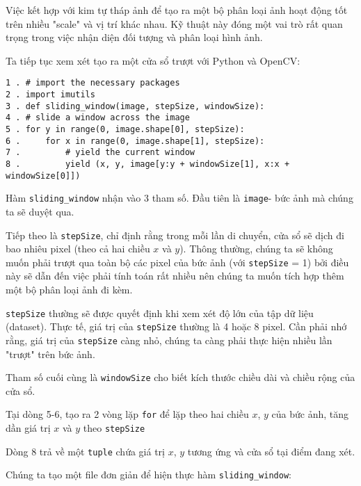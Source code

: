 \documentclass[12pt,a4paper]{article}
\begin{document}
Việc kết hợp với kim tự tháp ảnh để tạo ra một bộ phân loại ảnh hoạt động tốt trên nhiều "scale" và vị trí khác nhau. Kỹ thuật này đóng một vai trò rất quan trọng trong việc nhận diện đối tượng và phân loại hình ảnh.

Ta tiếp tục xem xét tạo ra một cửa sổ trượt với Python và OpenCV:
\begin{lstlisting}
1 . # import the necessary packages
2 . import imutils
3 . def sliding_window(image, stepSize, windowSize):
4 .	# slide a window across the image
5 .	for y in range(0, image.shape[0], stepSize):
6 .		for x in range(0, image.shape[1], stepSize):
7 .			# yield the current window
8 .			yield (x, y, image[y:y + windowSize[1], x:x + windowSize[0]])
\end{lstlisting}

Hàm \verb|sliding_window| nhận vào 3 tham số. Đầu tiên là \verb|image|- bức ảnh mà chúng ta sẽ duyệt qua.

Tiếp theo là \verb|stepSize|, chỉ định rằng trong mỗi lần di chuyển, cửa sổ sẽ dịch đi bao nhiêu pixel (theo cả hai chiều $x$ và $y$). Thông thường, chúng ta sẽ không muốn phải trượt qua toàn bộ các pixel của bức ảnh (với \verb|stepSize| = 1) bởi điều này sẽ dẫn đến việc phải tính toán rất nhiều nên chúng ta muốn tích hợp thêm một bộ phân loại ảnh đi kèm.

\verb|stepSize| thường sẽ được quyết định khi xem xét độ lớn của tập dữ liệu (dataset). Thực tế, giá trị của \verb|stepSize| thường là 4 hoặc 8 pixel. Cần phải nhớ rằng, giá trị của \verb|stepSize| càng nhỏ, chúng ta càng phải thực hiện nhiều lần "trượt" trên bức ảnh.

Tham số cuối cùng là \verb|windowSize| cho biết kích thước chiều dài và chiều rộng của cửa sổ.

Tại dòng 5-6, tạo ra 2 vòng lặp \verb|for| để lặp theo hai chiều $x$, $y$ của bức ảnh, tăng dần giá trị $x$ và $y$ theo \verb|stepSize|

Dòng 8 trả về một \verb|tuple| chứa giá trị $x$, $y$ tương ứng và cửa sổ tại điểm đang xét.

Chúng ta tạo một file đơn giản để hiện thực hàm \verb|sliding_window|:
\end{document}
